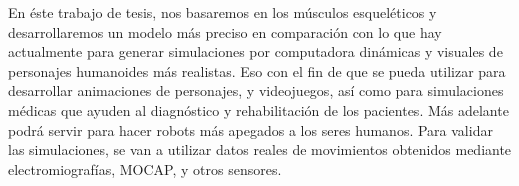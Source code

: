 En éste trabajo de tesis, nos basaremos en los músculos esqueléticos y desarrollaremos un modelo más preciso en comparación con lo que hay actualmente para generar simulaciones por computadora dinámicas y visuales de personajes humanoides más realistas. Eso con el fin de que se pueda utilizar para desarrollar animaciones de personajes, y videojuegos, así como para simulaciones médicas que ayuden al diagnóstico y rehabilitación de los pacientes. Más adelante podrá servir para hacer robots más apegados a los seres humanos. Para validar las simulaciones, se van a utilizar datos reales de movimientos obtenidos mediante electromiografías, MOCAP, y otros sensores.
%
%

